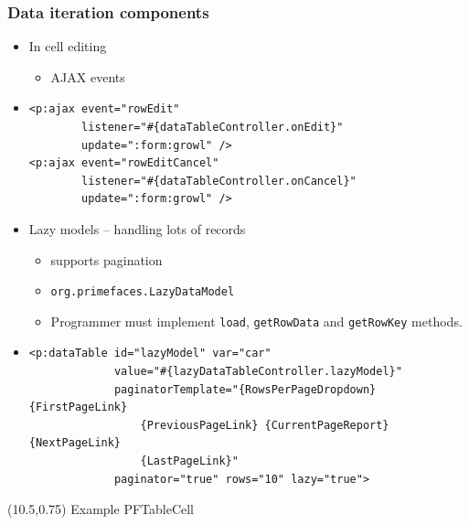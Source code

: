 \documentclass[10pt,xcolor=pdflatex]{beamer}
\begin{document}
\begin{frame}[containsverbatim]\frametitle{Data iteration components}
  \begin{itemize}
    \item In cell editing
	  \begin{itemize}
		\item AJAX events
      \end{itemize}
    \item[] \begin{footnotesize} \begin{verbatim}
<p:ajax event="rowEdit" 
        listener="#{dataTableController.onEdit}"
        update=":form:growl" />
<p:ajax event="rowEditCancel" 
        listener="#{dataTableController.onCancel}" 
        update=":form:growl" />     	
\end{verbatim} \end{footnotesize}
    \item Lazy models -- handling lots of records
      \begin{itemize}
    	\item supports pagination 
        \item \texttt{org.primefaces.LazyDataModel}
		\item Programmer must implement \texttt{load}, \texttt{getRowData} and \texttt{getRowKey} methods.
      \end{itemize}
    \item[] \begin{footnotesize} \begin{verbatim}
<p:dataTable id="lazyModel" var="car"
             value="#{lazyDataTableController.lazyModel}"
             paginatorTemplate="{RowsPerPageDropdown} {FirstPageLink} 
                 {PreviousPageLink} {CurrentPageReport} {NextPageLink} 
                 {LastPageLink}"
             paginator="true" rows="10" lazy="true"> 
\end{verbatim} \end{footnotesize}
  \end{itemize}
\begin{textblock}{10}(10.5,0.75)
    {\footnotesize Example PFTableCell}
\end{textblock}
\end{frame}
\end{document}

